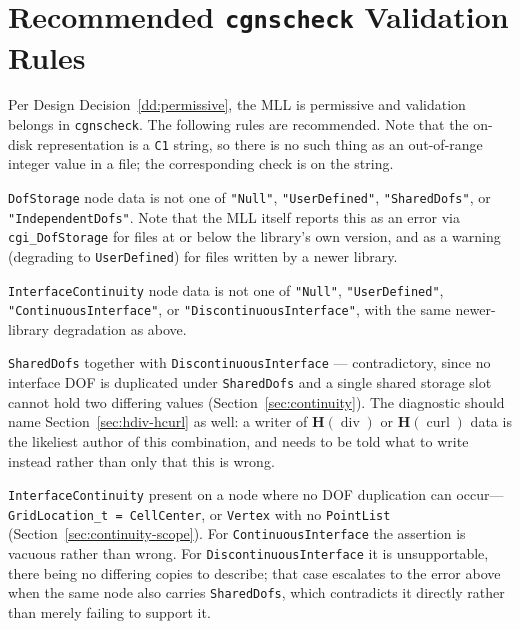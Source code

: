 \documentclass[11pt,letterpaper]{article}
\begin{document}
\section{Recommended \texttt{cgnscheck} Validation Rules}
\label{sec:cgnscheck}

Per Design Decision~\ref{dd:permissive}, the MLL is permissive and
validation belongs in \texttt{cgnscheck}.  The following rules are
recommended.  Note that the on-disk representation is a \texttt{C1}
string, so there is no such thing as an out-of-range integer value in
a file; the corresponding check is on the string.

\begin{description}[leftmargin=2em]

\item[Error:] \texttt{DofStorage} node data is not one of
  \texttt{"Null"}, \texttt{"UserDefined"}, \texttt{"SharedDofs"},
  or \texttt{"IndependentDofs"}.  Note that the MLL itself reports this as an
  error via \texttt{cgi\_DofStorage} for files at or below the
  library's own version, and as a warning (degrading to
  \texttt{UserDefined}) for files written by a newer library.

\item[Error:] \texttt{InterfaceContinuity} node data is not one of
  \texttt{"Null"}, \texttt{"UserDefined"},
  \texttt{"ContinuousInterface"}, or
  \texttt{"DiscontinuousInterface"}, with the same newer-library
  degradation as above.

\item[Error:] \texttt{SharedDofs} together with
  \texttt{DiscontinuousInterface} --- contradictory, since no interface
  DOF is duplicated under \texttt{SharedDofs} and a single shared storage
  slot cannot hold two differing values
  (Section~\ref{sec:continuity}).  The diagnostic should name
  Section~\ref{sec:hdiv-hcurl} as well: a writer of
  $\boldsymbol{H}(\operatorname{div})$ or
  $\boldsymbol{H}(\operatorname{curl})$ data is the likeliest author of
  this combination, and needs to be told what to write instead rather
  than only that this is wrong.

\item[Warning:] \texttt{InterfaceContinuity} present on a node where no
  DOF duplication can occur---\texttt{GridLocation\_t = CellCenter}, or
  \texttt{Vertex} with no \texttt{PointList}
  (Section~\ref{sec:continuity-scope}).  For
  \texttt{ContinuousInterface} the assertion is vacuous rather than
  wrong.  For \texttt{Discontinuous\-Interface} it is unsupportable,
  there being no differing copies to describe; that case escalates to the
  error above when the same node also carries \texttt{SharedDofs}, which
  contradicts it directly rather than merely failing to support it.


\end{description}
\end{document}
